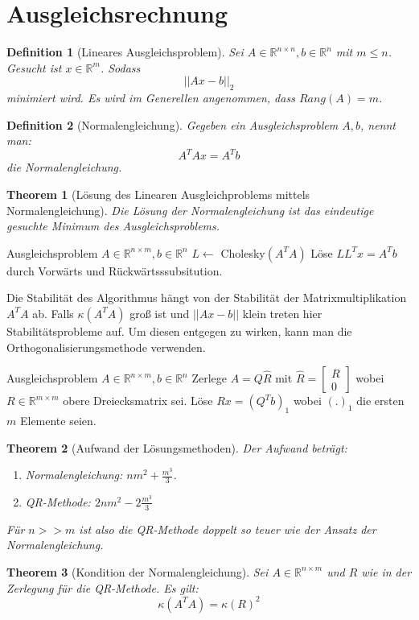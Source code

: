 \documentclass[10pt,a4paper]{article}
\newtheorem{theorem}{Theorem}
\newtheorem{definition}{Definition}
\begin{document}
	\section{Ausgleichsrechnung}
	\begin{definition}[Lineares Ausgleichsproblem]
		Sei $A\in \mathbb{R}^{n\times n}, b\in \mathbb{R}^n$ mit $m\leq n$. Gesucht ist $x\in \mathbb{R}^m$. Sodass $$||Ax-b||_2$$ minimiert wird. Es wird im Generellen angenommen, dass $Rang(A) = m$.
	\end{definition}
	\begin{definition}[Normalengleichung]
		Gegeben ein Ausgleichsproblem $A, b$, nennt man:
		$$A^TAx=A^Tb$$
		die Normalengleichung.
	\end{definition}
	\begin{theorem}[Lösung des Linearen Ausgleichproblems mittels Normalengleichung]
		Die Lösung der Normalengleichung ist das eindeutige gesuchte Minimum des Ausgleichsproblems.
	\end{theorem}
	\begin{algorithm}
		\caption{Lösen des Ausgleichproblems mittels Normalengleichung}
		\begin{algorithmic}
			\Require Ausgleichsproblem $A\in \mathbb{R}^{n\times m}, b\in \mathbb{R}^n$
			\State $L \leftarrow$ Cholesky$(A^TA)$
			\State Löse $LL^Tx = A^Tb$ durch Vorwärts und Rückwärtsssubsitution.
		\end{algorithmic}
	\end{algorithm}
	Die Stabilität des Algorithmus hängt von der Stabilität der Matrixmultiplikation $A^TA$ ab. 
	Falls $\kappa(A^TA)$ groß ist und $||Ax-b||$ klein treten hier Stabilitätsprobleme auf. Um diesen entgegen zu wirken, kann man die Orthogonalisierungsmethode verwenden.
	\begin{algorithm}
		\caption{Lösen des Ausgleichproblems mittels QR-Methode}
		\begin{algorithmic}
			\Require Ausgleichsproblem $A\in \mathbb{R}^{n\times m}, b\in \mathbb{R}^n$
			\State Zerlege $A= Q\hat{R}$ mit $\hat{R} = \begin{bmatrix}
				R\\
				0
			\end{bmatrix}$ wobei $R\in \mathbb{R}^{m\times m}$ obere Dreiecksmatrix sei.
			\State Löse $Rx = (Q^Tb)_1$ wobei $(.)_1$ die ersten $m$ Elemente seien.
		\end{algorithmic}
	\end{algorithm}
	\begin{theorem}[Aufwand der Lösungsmethoden]
		Der Aufwand beträgt:
		\begin{enumerate}
			\item Normalengleichung: $nm^2 + \frac{m^3}{3}$.
			\item QR-Methode: $2nm^2-2\frac{m^3}{3}$
		\end{enumerate}
		Für $n >> m$ ist also die QR-Methode doppelt so teuer wie der Ansatz der Normalengleichung. 
	\end{theorem}
	\begin{theorem}[Kondition der Normalengleichung]
		Sei $A \in \mathbb{R}^{n\times m}$ und $R$ wie in der Zerlegung für die QR-Methode. Es gilt:
		$$\kappa(A^TA) = \kappa(R)^2$$
	\end{theorem}
\end{document}
